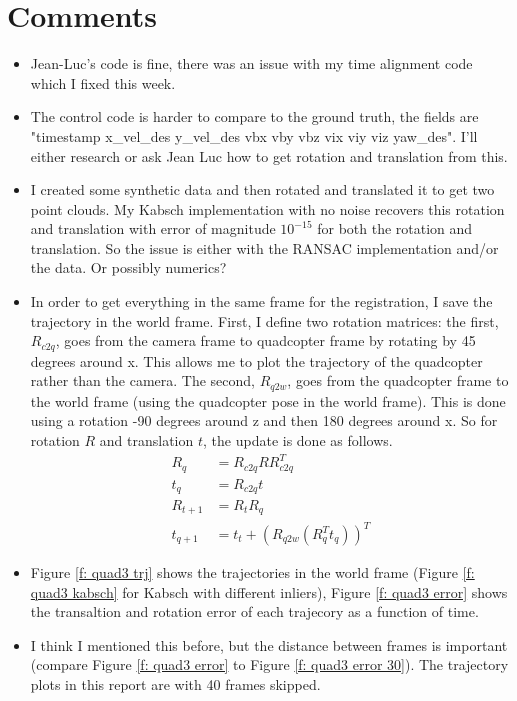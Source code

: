 \documentclass[12pt,a4paper]{article}
\begin{document}
\section{Comments}
\begin{itemize}
  \item Jean-Luc's code is fine, there was an issue with my time alignment code which I fixed this week.
  \item The control code is harder to compare to the ground truth, the fields are "timestamp x\_vel\_des y\_vel\_des vbx vby vbz vix viy viz yaw\_des". I'll either research or ask Jean Luc how to get rotation and translation from this.
  \item I created some synthetic data and then rotated and translated it to get two point clouds. My Kabsch implementation with no noise recovers this rotation and translation with error of magnitude $10^{-15}$ for both the rotation and translation. So the issue is either with the RANSAC implementation and/or the data. Or possibly numerics?
  \item In order to get everything in the same frame for the registration, I save the trajectory in the world frame. First, I define two rotation matrices: the first, $R_{c2q}$, goes from the camera frame to quadcopter frame by rotating by 45 degrees around x. This allows me to plot the trajectory of the quadcopter rather than the camera. The second, $R_{q2w}$, goes from the quadcopter frame to the world frame (using the quadcopter pose in the world frame). This is done using a rotation -90 degrees around z  and then 180 degrees around x. So for rotation $R$ and translation $t$, the update is done as follows.
  \begin{align*}
  R_q &= R_{c2q}RR_{c2q}^T \\
  t_q &= R_{c2q}t \\
  R_{t+1} &= R_tR_q \\
  t_{q+1} &= t_t + (R_{q2w}(R_q^T t_q))^T
  \end{align*}
  \item Figure \ref{f: quad3 trj} shows the trajectories in the world frame (Figure \ref{f: quad3 kabsch} for Kabsch with different inliers), Figure \ref{f: quad3 error} shows the transaltion and rotation error of each trajecory as a function of time.
  \item I think I mentioned this before, but the distance between frames is important (compare Figure \ref{f: quad3 error} to Figure \ref{f: quad3 error 30}). The trajectory plots in this report are with 40 frames skipped.
\end{itemize}
\end{document}

